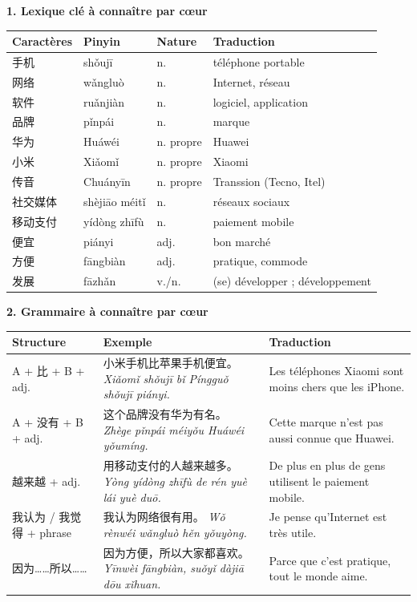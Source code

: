 \documentclass[11pt]{article}
\begin{document}
\begin{bilan}
\textbf{1. Lexique clé à connaître par cœur}

\begin{center}
\begin{tabularx}{\linewidth}{|X|X|X|X|}
\hline
\rowcolor{popblueL} Caractères & Pinyin & Nature & Traduction \\
\hline
手机 & shǒujī & n. & téléphone portable \\
\hline
网络 & wǎngluò & n. & Internet, réseau \\
\hline
软件 & ruǎnjiàn & n. & logiciel, application \\
\hline
品牌 & pǐnpái & n. & marque \\
\hline
华为 & Huáwéi & n. propre & Huawei \\
\hline
小米 & Xiǎomǐ & n. propre & Xiaomi \\
\hline
传音 & Chuányīn & n. propre & Transsion (Tecno, Itel) \\
\hline
社交媒体 & shèjiāo méitǐ & n. & réseaux sociaux \\
\hline
移动支付 & yídòng zhīfù & n. & paiement mobile \\
\hline
便宜 & piányi & adj. & bon marché \\
\hline
方便 & fāngbiàn & adj. & pratique, commode \\
\hline
发展 & fāzhǎn & v./n. & (se) développer ; développement \\
\hline
\end{tabularx}
\end{center}

\textbf{2. Grammaire à connaître par cœur}

\begin{center}
\begin{tabularx}{\linewidth}{|X|X|X|}
\hline
\rowcolor{popblueL} Structure & Exemple & Traduction \\
\hline
A + 比 + B + adj. & 小米手机比苹果手机便宜。 \emph{Xiǎomǐ shǒujī bǐ Píngguǒ shǒujī piányi.} & Les téléphones Xiaomi sont moins chers que les iPhone. \\
\hline
A + 没有 + B + adj. & 这个品牌没有华为有名。 \emph{Zhège pǐnpái méiyǒu Huáwéi yǒumíng.} & Cette marque n'est pas aussi connue que Huawei. \\
\hline
越来越 + adj. & 用移动支付的人越来越多。 \emph{Yòng yídòng zhīfù de rén yuè lái yuè duō.} & De plus en plus de gens utilisent le paiement mobile. \\
\hline
我认为 / 我觉得 + phrase & 我认为网络很有用。 \emph{Wǒ rènwéi wǎngluò hěn yǒuyòng.} & Je pense qu'Internet est très utile. \\
\hline
因为……所以…… & 因为方便，所以大家都喜欢。 \emph{Yīnwèi fāngbiàn, suǒyǐ dàjiā dōu xǐhuan.} & Parce que c'est pratique, tout le monde aime. \\
\hline
\end{tabularx}
\end{center}


\end{bilan}
\end{document}

